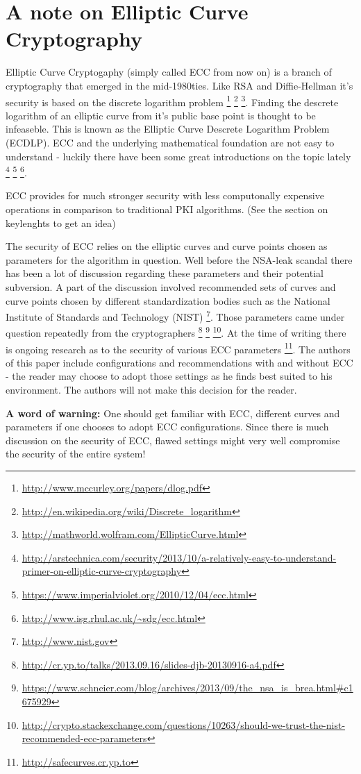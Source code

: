 \section{A note on Elliptic Curve Cryptography}

Elliptic Curve Cryptogaphy (simply called ECC from now on) is a branch of 
cryptography that emerged in the mid-1980ties. Like RSA and Diffie-Hellman 
it's security is based on the discrete logarithm problem
\footnote{\url{http://www.mccurley.org/papers/dlog.pdf}} 
\footnote{\url{http://en.wikipedia.org/wiki/Discrete\_logarithm}}
\footnote{\url{http://mathworld.wolfram.com/EllipticCurve.html}}.
Finding the descrete logarithm of an elliptic curve from it's public base
point is thought to be infeaseble. This is known as the Elliptic Curve Descrete 
Logarithm Problem (ECDLP). ECC and the underlying mathematical foundation are not easy 
to understand - luckily there have been some great introductions on the topic lately
\footnote{\url{http://arstechnica.com/security/2013/10/a-relatively-easy-to-understand-primer-on-elliptic-curve-cryptography}}
\footnote{\url{https://www.imperialviolet.org/2010/12/04/ecc.html}}
\footnote{\url{http://www.isg.rhul.ac.uk/~sdg/ecc.html}}.

ECC provides for much stronger security with less computonally expensive
operations in comparison to traditional PKI algorithms. (See the section 
on keylenghts to get an idea)


The security of ECC relies on the elliptic curves and curve points chosen
as parameters for the algorithm in question. Well before the NSA-leak scandal
there has been a lot of discussion regarding these parameters and their 
potential subversion. A part of the discussion involved recommended sets 
of curves and curve points chosen by different standardization bodies such 
as the National Institute of Standards and Technology (NIST) 
\footnote{\url{http://www.nist.gov}}. 
Those parameters came under question repeatedly from the cryptographers
\footnote{\url{http://cr.yp.to/talks/2013.09.16/slides-djb-20130916-a4.pdf}}
\footnote{\url{https://www.schneier.com/blog/archives/2013/09/the\_nsa\_is\_brea.html\#c1675929}}
\footnote{\url{http://crypto.stackexchange.com/questions/10263/should-we-trust-the-nist-recommended-ecc-parameters}}.
At the time of writing there is ongoing research as to the security of 
various ECC parameters
\footnote{\url{http://safecurves.cr.yp.to}}.
The authors of this paper include configurations and recommendations
with and without ECC - the reader may choose to adopt those settings
as he finds best suited to his environment. The authors will not make
this decision for the reader.


\textbf{A word of warning:} One should get familiar with ECC, different curves and
parameters if one chooses to adopt ECC configurations. Since there is much 
discussion on the security of ECC, flawed settings might very well compromise the 
security of the entire system!


